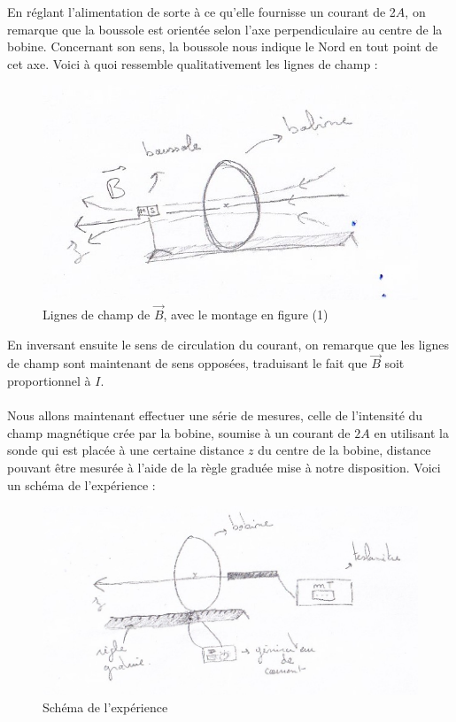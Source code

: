 \documentclass[12pt,a4paper]{article}
\begin{document}
En réglant l'alimentation de sorte à ce qu'elle fournisse un courant de 2$A$, on remarque que la boussole est orientée selon l'axe perpendiculaire au centre de la bobine. Concernant son sens, la boussole nous indique le Nord en tout point de cet axe. Voici à quoi ressemble qualitativement les lignes de champ : \\
\begin{figure}[H]
\begin{center}
\includegraphics[scale=1]{ldc.jpg}   
\caption{Lignes de champ de $\vec{B}$, avec le montage en figure (1)}
\end{center}
\end{figure}
En inversant ensuite le sens de circulation du courant, on remarque que les lignes de champ sont maintenant de sens opposées, traduisant le fait que $\vec{B}$ soit proportionnel à $I$.\\
\\Nous allons maintenant effectuer une série de mesures, celle de l'intensité du champ magnétique crée par la bobine, soumise à un courant de $2A$ en utilisant la sonde qui est placée à une certaine distance $z$ du centre de la bobine, distance pouvant être mesurée à l'aide de la règle graduée mise à notre disposition. Voici un schéma de l'expérience : \\
\begin{figure}[H]
\begin{center}
\includegraphics[scale=1]{exp1.jpg}   
\caption{Schéma de l'expérience}
\end{center}
\end{figure}
\end{document}
